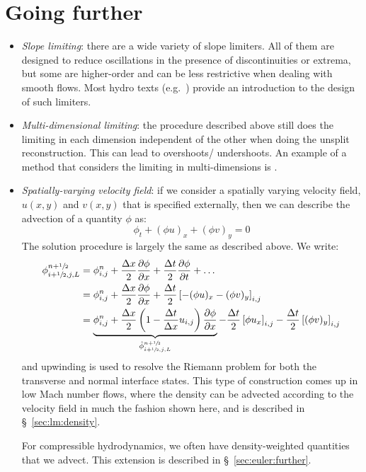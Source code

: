 \section{Going further}

\begin{itemize}

\item {\em Slope limiting}: there are a wide variety of slope
  limiters.  All of them are designed to reduce oscillations in the
  presence of discontinuities or extrema, but some are higher-order
  and can be less restrictive when dealing with smooth flows.  Most
  hydro texts (e.g.\ \cite{leveque:2002,toro:1997}) provide an
  introduction to the design of such limiters.

\item {\em Multi-dimensional limiting}: the procedure described above
  still does the limiting in each dimension independent of the other
  when doing the unsplit reconstruction.  This can lead to overshoots/
  undershoots.  An example of a method that considers the limiting
  in multi-dimensions is \cite{BDS,quadBDS}.

\item {\em Spatially-varying velocity field}: if we consider a spatially
  varying velocity field, $u(x,y)$ and $v(x,y)$ that is specified externally,
  then we can describe the advection of a quantity $\phi$ as:
  \begin{equation}
  \phi_t + (\phi u)_x + (\phi v)_y = 0
  \end{equation}
  The solution procedure is largely the same as described above.  We write:
\begin{align}
\phi_{i+\myhalf,j,L}^{n+\myhalf} &= \phi_{i,j}^n +
   \frac{\Delta x}{2} \frac{\partial \phi}{\partial x} +
   \frac{\Delta t}{2} \frac{\partial \phi}{\partial t} + \ldots \nonumber \\
%
 &= \phi_{i,j}^n +
    \frac{\Delta x}{2} \frac{\partial \phi}{\partial x} +
    \frac{\Delta t}{2} \left [ -(\phi u)_x -(\phi v)_y \right ]_{i,j} \nonumber\\
%
 &= \underbrace{\phi_{i,j}^n +
   \frac{\Delta x}{2} \left ( 1 - \frac{\Delta t}{\Delta x} u_{i,j} \right )
        \frac{\partial \phi}{\partial x}}_{\hat{\phi}_{i+\myhalf,j,L}^{n+\myhalf}}
   - \frac{\Delta t}{2} \left [\phi u_x \right ]_{i,j}
   - \frac{\Delta t}{2} \left [ (\phi v)_y \right ]_{i,j}
\end{align}
  and upwinding is used to resolve the Riemann problem for both the
  transverse and normal interface states.  This type of construction
  comes up in low Mach number flows, where the density can be advected
  according to the velocity field in much the fashion shown here, and
  is described in \S~\ref{sec:lm:density}.


  For compressible hydrodynamics, we often have density-weighted quantities
  that we advect.  This extension is described in \S~\ref{sec:euler:further}.

\end{itemize}



